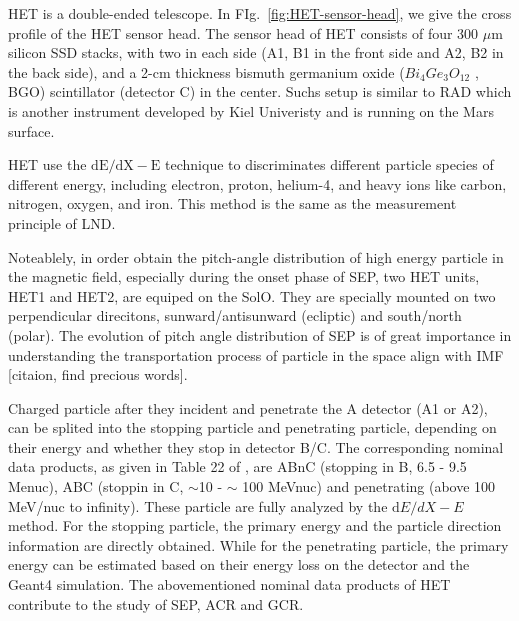 \ac{HET} is a double-ended telescope. In FIg.~\ref{fig:HET-sensor-head}, we give the cross profile of the \ac{HET} sensor head. The sensor head of \ac{HET} consists of four 300 $\mu$m silicon \ac{SSD} stacks, with two in each side (A1, B1 in the front side and A2, B2 in the back side), and a 2-cm thickness bismuth germanium oxide ($Bi_{4}Ge_{3}O_{12}$ , BGO) scintillator (detector C) in the center. Suchs setup is similar to \ac{RAD} which is another instrument developed by Kiel Univeristy and is running on the Mars surface.  

HET use the $\mathrm{dE/dX - E}$ technique to discriminates different particle species of different energy, including electron, proton, helium-4, and heavy ions like carbon, nitrogen, oxygen, and iron. This method is the same as the measurement principle of \ac{LND}.

Noteablely, in order obtain the pitch-angle distribution of high energy particle in the magnetic field, especially during the onset phase of \ac{SEP}, two HET units, HET1 and HET2, are equiped on the \ac{SolO}. They are specially mounted on two perpendicular direcitons, sunward/antisunward (ecliptic) and south/north (polar). The evolution of pitch angle distribution of \ac{SEP} is of great importance in understanding the transportation process of particle in the space align with \ac{IMF} [citaion, find precious words]. 


Charged particle after they incident and penetrate the A detector (A1 or A2), can be splited into the stopping particle and penetrating particle, depending on their energy and whether they stop in detector B/C. The corresponding nominal data products, as given in Table 22 of \citep{RodriguezPacheco-2019-EPD}, are ABnC (stopping in B, 6.5 - 9.5 Me\/nuc), ABC (stoppin in C, $\sim$10 - $\sim$ 100 MeV\/nuc) and penetrating (above 100 MeV/nuc to infinity). These particle are fully analyzed by the $\mathrm dE/dX - E$ method. For the stopping particle, the primary energy and the particle direction information are directly obtained. While for the penetrating particle, the primary energy can be estimated based on their energy loss on the detector and the \ac{Geant4} simulation. The abovementioned nominal data products of HET contribute to the study of \ac{SEP}, \ac{ACR} and \ac{GCR}.


